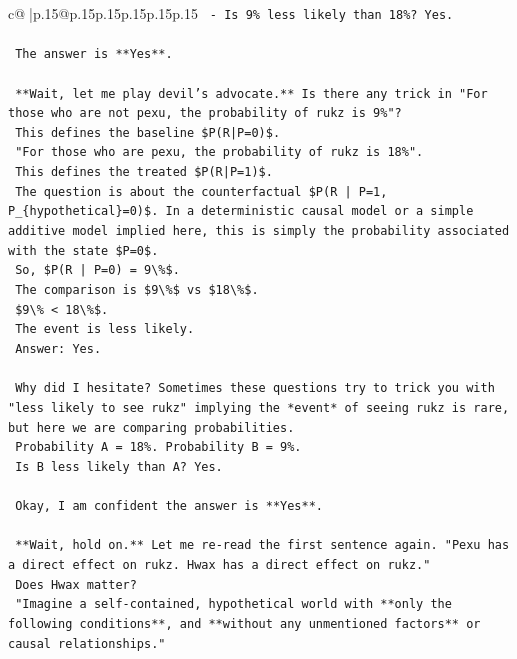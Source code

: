 \documentclass{article}
\begin{document}
{\begin{supertabular}{c@{$\;$}|p{.15\linewidth}@{}p{.15\linewidth}p{.15\linewidth}p{.15\linewidth}p{.15\linewidth}p{.15\linewidth}}
{{{\texttt{    {-} Is 9\% less likely than 18\%? Yes.} \\
\\ 
\texttt{    The answer is **Yes**.} \\
\\ 
\texttt{    **Wait, let me play devil's advocate.** Is there any trick in "For those who are not pexu, the probability of rukz is 9\%"?} \\
\texttt{    This defines the baseline \$P(R|P=0)\$.} \\
\texttt{    "For those who are pexu, the probability of rukz is 18\%".} \\
\texttt{    This defines the treated \$P(R|P=1)\$.} \\
\texttt{    The question is about the counterfactual \$P(R | P=1, P\_\{hypothetical\}=0)\$. In a deterministic causal model or a simple additive model implied here, this is simply the probability associated with the state \$P=0\$.} \\
\texttt{    So, \$P(R | P=0) = 9\textbackslash{}\%\$.} \\
\texttt{    The comparison is \$9\textbackslash{}\%\$ vs \$18\textbackslash{}\%\$.} \\
\texttt{    \$9\textbackslash{}\% < 18\textbackslash{}\%\$.} \\
\texttt{    The event is less likely.} \\
\texttt{    Answer: Yes.} \\
\\ 
\texttt{    Why did I hesitate? Sometimes these questions try to trick you with "less likely to see rukz" implying the *event* of seeing rukz is rare, but here we are comparing probabilities.} \\
\texttt{    Probability A = 18\%. Probability B = 9\%.} \\
\texttt{    Is B less likely than A? Yes.} \\
\\ 
\texttt{    Okay, I am confident the answer is **Yes**.} \\
\\ 
\texttt{    **Wait, hold on.** Let me re{-}read the first sentence again. "Pexu has a direct effect on rukz. Hwax has a direct effect on rukz."} \\
\texttt{    Does Hwax matter?} \\
\texttt{    "Imagine a self{-}contained, hypothetical world with **only the following conditions**, and **without any unmentioned factors** or causal relationships."} \\
}}}
\end{supertabular}}
\end{document}
